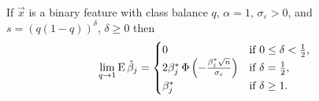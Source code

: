 \begin{theorem}
  \label{thm:binary-varscale-bias}
  If \(\vec{x}\) is a binary feature with class balance \(q\), \(\alpha = 1\), \(\sigma_\varepsilon > 0\), and \(s = (q(1-q))^{\delta}\), \(\delta \geq 0\) then
  \[
    \lim_{q \rightarrow 1} \operatorname{E} \hat{\beta}_j =
    \begin{cases}
      0                                                                           & \text{if } 0 \leq \delta < \frac{1}{2}, \\
      2 \beta_j^* \operatorname{\Phi}\left(-\frac{\beta_j^* \sqrt{n}}{\sigma_\varepsilon}\right) & \text{if } \delta = \frac{1}{2},        \\
      \beta^*_j                                                                   & \text{if } \delta \geq 1.
    \end{cases}
  \]
\end{theorem}
